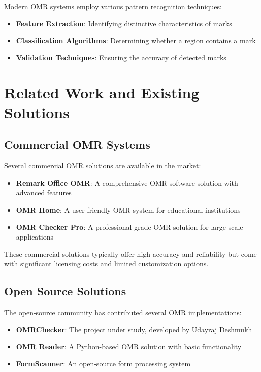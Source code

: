 Modern OMR systems employ various pattern recognition techniques:

\begin{itemize}
\item \textbf{Feature Extraction}: Identifying distinctive characteristics of marks
\item \textbf{Classification Algorithms}: Determining whether a region contains a mark
\item \textbf{Validation Techniques}: Ensuring the accuracy of detected marks
\end{itemize}

\section{Related Work and Existing Solutions}

\subsection{Commercial OMR Systems}

Several commercial OMR solutions are available in the market:

\begin{itemize}
\item \textbf{Remark Office OMR}: A comprehensive OMR software solution with advanced features
\item \textbf{OMR Home}: A user-friendly OMR system for educational institutions
\item \textbf{OMR Checker Pro}: A professional-grade OMR solution for large-scale applications
\end{itemize}

These commercial solutions typically offer high accuracy and reliability but come with significant licensing costs and limited customization options.

\subsection{Open Source Solutions}

The open-source community has contributed several OMR implementations:

\begin{itemize}
\item \textbf{OMRChecker}: The project under study, developed by Udayraj Deshmukh
\item \textbf{OMR Reader}: A Python-based OMR solution with basic functionality
\item \textbf{FormScanner}: An open-source form processing system
\end{itemize}

